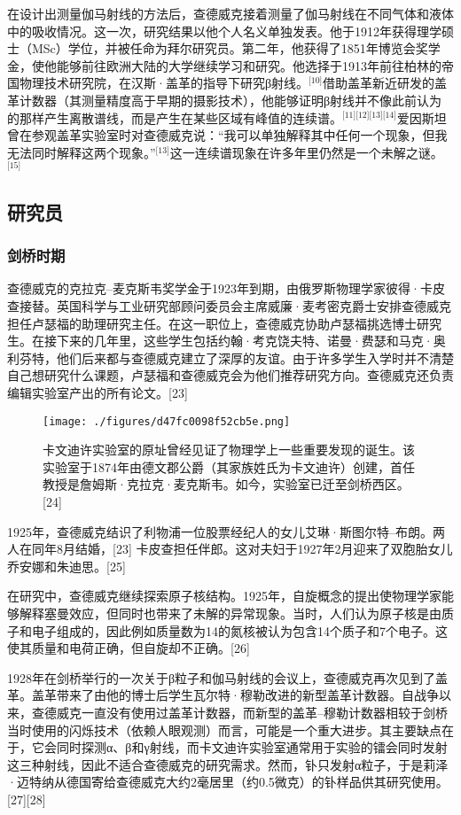 在设计出测量伽马射线的方法后，查德威克接着测量了伽马射线在不同气体和液体中的吸收情况。这一次，研究结果以他个人名义单独发表。他于1912年获得理学硕士（MSc）学位，并被任命为拜尔研究员。第二年，他获得了1851年博览会奖学金，使他能够前往欧洲大陆的大学继续学习和研究。他选择于1913年前往柏林的帝国物理技术研究院，在汉斯·盖革的指导下研究β射线。\(^\text{[10]}\)借助盖革新近研发的盖革计数器（其测量精度高于早期的摄影技术），他能够证明β射线并不像此前认为的那样产生离散谱线，而是产生在某些区域有峰值的连续谱。\(^\text{[11][12][13][14]}\)爱因斯坦曾在参观盖革实验室时对查德威克说：“我可以单独解释其中任何一个现象，但我无法同时解释这两个现象。”\(^\text{[13]}\)这一连续谱现象在许多年里仍然是一个未解之谜。\(^\text{[15]}\)
\subsection{研究员}
\subsubsection{剑桥时期}
查德威克的克拉克–麦克斯韦奖学金于1923年到期，由俄罗斯物理学家彼得·卡皮查接替。英国科学与工业研究部顾问委员会主席威廉·麦考密克爵士安排查德威克担任卢瑟福的助理研究主任。在这一职位上，查德威克协助卢瑟福挑选博士研究生。在接下来的几年里，这些学生包括约翰·考克饶夫特、诺曼·费瑟和马克·奥利芬特，他们后来都与查德威克建立了深厚的友谊。由于许多学生入学时并不清楚自己想研究什么课题，卢瑟福和查德威克会为他们推荐研究方向。查德威克还负责编辑实验室产出的所有论文。[23]
\begin{figure}[ht]
\centering
\texttt{[image: ./figures/d47fc0098f52cb5e.png]}
\caption{卡文迪许实验室的原址曾经见证了物理学上一些重要发现的诞生。该实验室于1874年由德文郡公爵（其家族姓氏为卡文迪许）创建，首任教授是詹姆斯·克拉克·麦克斯韦。如今，实验室已迁至剑桥西区。[24]} \label{fig_ZMcdw_1}
\end{figure}
1925年，查德威克结识了利物浦一位股票经纪人的女儿艾琳·斯图尔特–布朗。两人在同年8月结婚，[23] 卡皮查担任伴郎。这对夫妇于1927年2月迎来了双胞胎女儿乔安娜和朱迪思。[25]

在研究中，查德威克继续探索原子核结构。1925年，自旋概念的提出使物理学家能够解释塞曼效应，但同时也带来了未解的异常现象。当时，人们认为原子核是由质子和电子组成的，因此例如质量数为14的氮核被认为包含14个质子和7个电子。这使其质量和电荷正确，但自旋却不正确。[26]

1928年在剑桥举行的一次关于β粒子和伽马射线的会议上，查德威克再次见到了盖革。盖革带来了由他的博士后学生瓦尔特·穆勒改进的新型盖革计数器。自战争以来，查德威克一直没有使用过盖革计数器，而新型的盖革–穆勒计数器相较于剑桥当时使用的闪烁技术（依赖人眼观测）而言，可能是一个重大进步。其主要缺点在于，它会同时探测α、β和γ射线，而卡文迪许实验室通常用于实验的镭会同时发射这三种射线，因此不适合查德威克的研究需求。然而，钋只发射α粒子，于是莉泽·迈特纳从德国寄给查德威克大约2毫居里（约0.5微克）的钋样品供其研究使用。[27][28]

